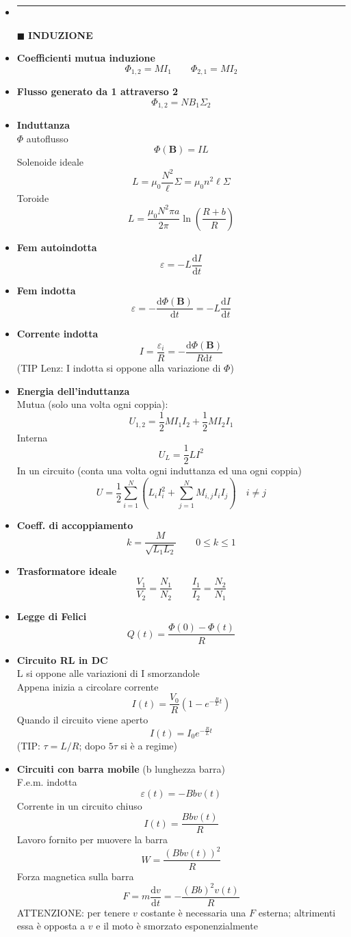 \documentclass{book}
\newcommand{\g}{\textbf}
\newcommand{\h}{\mathbf}
\newcommand{\e}{\begin{equation}}
\newcommand{\ex}{\end{equation} }
\renewcommand{\it}{\item[$\cdot$]}
\newcommand{\sep}{\item[]\rule{\linewidth}{0.4pt}}
\begin{document}
\begin{multicols}{4}
\begin{itemize}
\sep
\item [$\blacksquare$] \g{INDUZIONE}
    \it \g{Coefficienti mutua induzione}
        \e{\Phi_{1,2}=MI_1 \qquad \Phi_{2,1}=MI_2} \ex
    \it \g{Flusso generato da 1 attraverso 2} 
        \e{\Phi_{1,2}=NB_1\Sigma_2} \ex
    \it \g{Induttanza}\\
        $\Phi$ autoflusso
        \e{\Phi(\h{B})=IL} \ex
        Solenoide ideale
        \e{L=\mu_0\frac{N^2}{\ell}\Sigma=\mu_0n^2\ell\Sigma}\ex
        Toroide 
        \e{L = \frac{\mu_0 N^2 \pi a}{2\pi} \ln\left(\frac{R+b}{R}\right)}\ex
    \it \g{Fem autoindotta}
        \e{\varepsilon=-L\frac{\mathrm{d}I}{\mathrm{d}t}} \ex
    \it \g{Fem indotta}
        \e{\varepsilon=-\frac{\mathrm{d}\Phi(\h{B})}{\mathrm{d}t}=-L\frac{\mathrm{d}I}{\mathrm{d}t}} \ex
    \it \g{Corrente indotta}
        \e{I=\frac{\varepsilon_i}{R}=-\frac{\mathrm{d}\Phi(\h{B})}{R\mathrm{d}t}} \ex
        (TIP Lenz: I indotta si oppone alla variazione di $\Phi$)
    \it \g{Energia dell'induttanza} \\
        Mutua (solo una volta ogni coppia):
        \e{U_{1,2}=\frac{1}{2}MI_1I_2+\frac{1}{2}MI_2I_1}\ex
        Interna
        \e{U_L=\frac{1}{2}LI^2} \ex
        In un circuito (conta una volta ogni induttanza ed una ogni coppia)
        \e{U=\frac{1}{2}\sum_{i=1}^N(L_iI_i^2+\sum_{j=1}^N M_{i,j}I_iI_j) \quad i\neq j} \ex
    \it \g{Coeff. di accoppiamento}
        \e{k=\frac{M}{\sqrt{L_1L_2}} \qquad 0\leq k\leq 1} \ex
    \it \g{Trasformatore ideale}
        \e{\frac{V_1}{V_2}=\frac{N_1}{N_2} \qquad \frac{I_1}{I_2}=\frac{N_2}{N_1}} \ex
    \it \g{Legge di Felici}
        \e{Q(t)=\frac{\Phi(0)-\Phi(t)}{R}} \ex
    \it \g{Circuito RL in DC}\\
        L si oppone alle variazioni di I smorzandole \\
        Appena inizia a circolare corrente \\
        \e{I(t)=\frac{V_0}{R}(1-e^{-\frac{R}{L}t})} \ex
        Quando il circuito viene aperto \\
        \e{I(t)=I_0 e^{-\frac{R}{L}t}} \ex
        (TIP: $\tau=L/R$; dopo $5\tau$ si è a regime)
    \it \g{Circuiti con barra mobile} (b lunghezza barra) \\
        F.e.m. indotta
        \e{\varepsilon(t)=-Bbv(t)}\ex
        Corrente in un circuito chiuso
        \e{I(t)=\frac{Bbv(t)}{R}}\ex
        Lavoro fornito per muovere la barra
        \e{W=\frac{(Bbv(t))^2}{R}}\ex
        Forza magnetica sulla barra
        \e{F=m\frac{\mathrm{d}v}{\mathrm{d}t}=-\frac{(Bb)^2v(t)}{R}} \ex
        ATTENZIONE: per tenere $v$ costante è necessaria una $F$ esterna; altrimenti essa è opposta a $v$ e il moto è smorzato esponenzialmente \\

\end{itemize}
\end{multicols}
\end{document}
